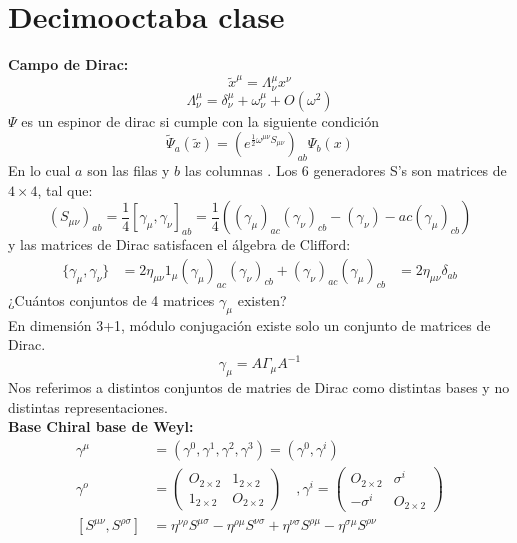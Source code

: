 \documentclass[../main.tex]{subfiles}
\begin{document}
\section{Decimooctaba clase}
\textbf{Campo de Dirac:}
\begin{equation*}
  \tilde{x}^\mu = \Lambda^\mu_\nu x^\nu
\end{equation*}
\begin{equation*}
  \Lambda_\nu^\mu = \delta^\mu_\nu + \omega^\mu_\nu + O(\omega^2)
\end{equation*}
$\Psi$ es un espinor de dirac si cumple con la siguiente condición
\begin{equation}
  \tilde{\Psi}_a(\tilde{x}) = \left( e^{\frac{1}{2}\omega^{\mu \nu}S_{\mu \nu}} \right)_{ab}\Psi_b(x)
 \end{equation}
 En lo cual $a$ son las filas y $b$ las columnas . Los 6 generadores S's son matrices de $4\times 4$, tal que:
 \begin{equation}
   \left( S_{\mu\nu} \right)_{ab} = \frac{1}{4} \left[ \gamma_\mu , \gamma_\nu \right]_{ab}  = \frac{1}{4} \left( \left( \gamma_\mu \right)_{ac} \left( \gamma_\nu \right)_{cb} - \left( \gamma_\nu \right)-{ac} \left( \gamma_\mu \right)_{cb} \right)
  \end{equation}
  y las matrices de Dirac satisfacen el álgebra de Clifford:
  \begin{align*}
    \{ \gamma_\mu , \gamma_\nu  \} & = 2\eta_{\mu \nu}1_\mu
    \left( \gamma_\mu \right)_{ac} \left( \gamma_\nu \right)_{cb} + \left( \gamma_\nu \right)_{ac} \left( \gamma_\mu \right)_{cb} & = 2\eta_{\mu \nu} \delta_{ab}
  \end{align*}
  ¿Cuántos conjuntos de 4 matrices $\gamma_\mu$ existen? \\
  En dimensión 3+1, módulo conjugación existe solo un conjunto de matrices de Dirac.
  \begin{equation*}
    \gamma_\mu = A \Gamma_\mu A^{-1}
  \end{equation*}
  Nos referimos a distintos conjuntos de matries de Dirac como distintas bases y no distintas representaciones. \\
  \textbf{Base Chiral  base de Weyl:}
  \begin{align*}
    \gamma^\mu & = \left( \gamma^0, \gamma^1 , \gamma^2 , \gamma^3 \right) = \left( \gamma^0, \gamma^i \right) \\
    \gamma^o & = \begin{pmatrix}
      O_{2\times 2} & 1_{2\times 2} \\
      1_{2 \times 2} & O_{2\times 2}
    \end{pmatrix} \quad, \gamma^i = \begin{pmatrix}
      O_{2\times 2} & \sigma^i \\
      -\sigma^i & O_{2\times 2}
    \end{pmatrix} \\
    \left[ S^{\mu\nu} , S^{\rho \sigma} \right] & = \eta^{\nu \rho} S^{\mu \sigma} - \eta^{\rho \mu} S^{\nu \sigma} + \eta^{\nu \sigma}S^{\rho \mu} - \eta^{\sigma \mu} S^{\rho \nu}
  \end{align*}
\end{document}

